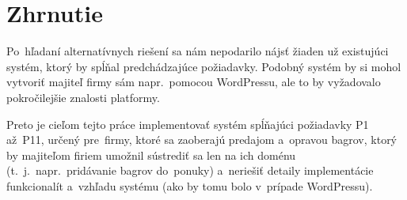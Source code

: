 \section{Zhrnutie}

Po~hľadaní alternatívnych riešení sa nám nepodarilo nájsť žiaden už existujúci systém, ktorý by spĺňal predchádzajúce požiadavky. Podobný systém by si mohol vytvoriť majiteľ firmy sám napr.~pomocou WordPressu, ale to by vyžadovalo pokročilejšie znalosti platformy.

Preto je cieľom tejto práce implementovať systém spĺňajúci požiadavky P1 až~P11, určený pre~firmy, ktoré sa zaoberajú predajom a~opravou bagrov, ktorý by majiteľom firiem umožnil sústrediť sa len na ich doménu (t.~j.~napr.~pridávanie bagrov do~ponuky) a~neriešiť detaily implementácie funkcionalít a~vzhľadu systému (ako by tomu bolo v~prípade WordPressu).
